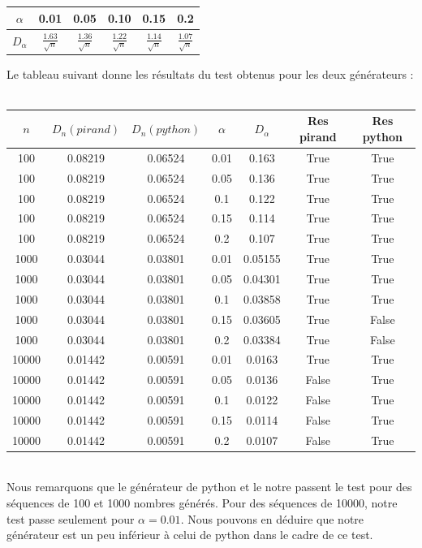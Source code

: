 \documentclass[10pt,a4paper]{article}
\begin{document}
\begin{center}
\begin{tabular}{|c|c|c|c|c|c|}
\hline
$\alpha$ &0.01& 0.05& 0.10& 0.15& 0.2\\
\hline
$D_\alpha$ & $\frac{1.63}{\sqrt{n}}$ & $\frac{1.36}{\sqrt{n}}$ & $\frac{1.22}{\sqrt{n}}$ & $\frac{1.14}{\sqrt{n}}$ & $\frac{1.07}{\sqrt{n}}$\\
\hline
\end{tabular}
\end{center}
Le tableau suivant donne les résultats du test obtenus pour les deux générateurs : \\\\
\begin{tabular}{|c|c|c|c|c|c|c|}
\hline
 $n$ & $D_{n} (pirand)$ & $D_{n} (python)$ & $\alpha$ & $D_{\alpha}$ & Res pirand & Res python\\ 
\hline 
100&0.08219&0.06524 & 0.01&0.163 & True & True\\\hline 
100&0.08219&0.06524 & 0.05&0.136 & True & True\\\hline 
100&0.08219&0.06524 & 0.1&0.122 & True & True\\\hline 
100&0.08219&0.06524 & 0.15&0.114 & True & True\\\hline 
100&0.08219&0.06524 & 0.2&0.107 & True & True\\\hline 
1000&0.03044&0.03801 & 0.01&0.05155 & True & True\\\hline 
1000&0.03044&0.03801 & 0.05&0.04301 & True & True\\\hline 
1000&0.03044&0.03801 & 0.1&0.03858 & True & True\\\hline 
1000&0.03044&0.03801 & 0.15&0.03605 & True & False\\\hline 
1000&0.03044&0.03801 & 0.2&0.03384 & True & False\\\hline 
10000&0.01442&0.00591 & 0.01&0.0163 & True & True\\\hline 
10000&0.01442&0.00591 & 0.05&0.0136 & False & True\\\hline 
10000&0.01442&0.00591 & 0.1&0.0122 & False & True\\\hline 
10000&0.01442&0.00591 & 0.15&0.0114 & False & True\\\hline 
10000&0.01442&0.00591 & 0.2&0.0107 & False & True\\\hline
\end{tabular}\\
\newline 
Nous remarquons que le générateur de python et le notre passent le test pour des séquences de 100 et 1000 nombres générés. Pour des séquences de 10000, notre test passe seulement pour $\alpha = 0.01$. Nous pouvons en déduire que notre générateur est un peu inférieur à celui de python dans le cadre de ce test.
\end{document}
